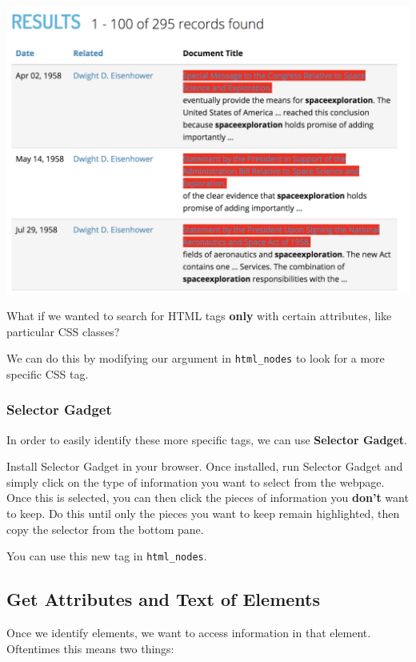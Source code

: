 \documentclass[]{book}
\begin{document}
\begin{center}\includegraphics[width=0.7\linewidth]{img/scraping_links} \end{center}

What if we wanted to search for HTML tags \textbf{only} with certain attributes, like particular CSS classes?

We can do this by modifying our argument in \texttt{html\_nodes} to look for a more specific CSS tag.

\hypertarget{selector-gadget}{%
\subsubsection*{Selector Gadget}\label{selector-gadget}}

In order to easily identify these more specific tags, we can use \textbf{Selector Gadget}.

Install Selector Gadget in your browser. Once installed, run Selector Gadget and simply click on the type of information you want to select from the webpage. Once this is selected, you can then click the pieces of information you \textbf{don't} want to keep. Do this until only the pieces you want to keep remain highlighted, then copy the selector from the bottom pane.

You can use this new tag in \texttt{html\_nodes}.

\hypertarget{get-attributes-and-text-of-elements}{%
\subsection{Get Attributes and Text of Elements}\label{get-attributes-and-text-of-elements}}

Once we identify elements, we want to access information in that element. Oftentimes this means two things:
\end{document}
